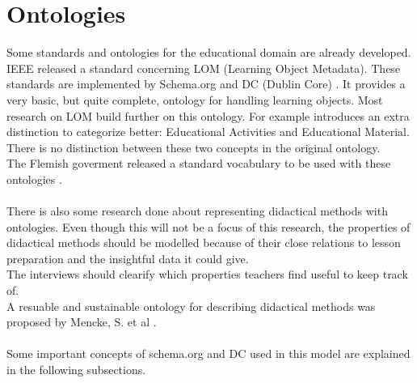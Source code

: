 \documentclass[a4paper]{report}
\begin{document}
    \section{Ontologies}
    \label{subsection:ontologies}
    Some standards and ontologies for the educational domain are already developed.
    IEEE released a standard \cite{ieeelom} concerning LOM (Learning Object Metadata). These standards are implemented by Schema.org \cite{schema} and DC (Dublin Core) \cite{dc}.
    It provides a very basic, but quite complete, ontology for handling learning objects. Most research on LOM build further on this ontology. For example \cite{usecasebased} introduces an extra
    distinction to categorize better: Educational Activities and Educational Material. There is no distinction between these two concepts in the original ontology. \\
    The Flemish goverment released a standard vocabulary to be used with these ontologies\cite{pubelo} \cite{pubelovoc}. \\ \\
    There is also some research done about representing didactical methods with ontologies. Even though this will not be a focus of this research, the properties of didactical methods should be modelled because of their close relations to lesson preparation and the insightful data it could give.\\
    The interviews should clearify which properties teachers find useful to keep track of.\\
    A resuable and sustainable ontology for describing didactical methods was proposed by Mencke, S. et al \cite{hierarchy}.\\ \\
    Some important concepts of schema.org and DC used in this model are explained in the following subsections.
\end{document}
